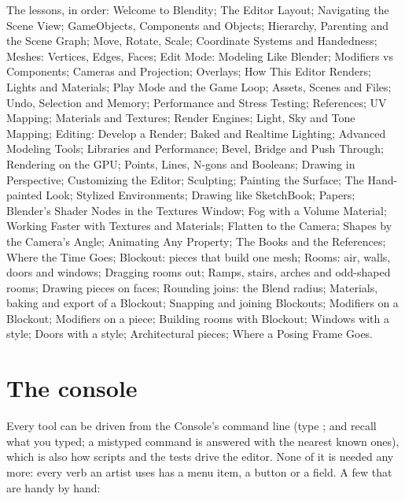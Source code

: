 The lessons, in order: Welcome to Blendity; The Editor Layout; Navigating the Scene View; GameObjects, Components and
Objects; Hierarchy, Parenting and the Scene Graph; Move, Rotate, Scale; Coordinate Systems and Handedness; Meshes:
Vertices, Edges, Faces; Edit Mode: Modeling Like Blender; Modifiers vs Components; Cameras and Projection; Overlays;
How This Editor Renders; Lights and Materials; Play Mode and the Game Loop; Assets, Scenes and Files; Undo, Selection
and Memory; Performance and Stress Testing; References; UV Mapping; Materials and Textures; Render Engines; Light, Sky
and Tone Mapping; Editing: Develop a Render; Baked and Realtime Lighting; Advanced Modeling Tools; Libraries and
Performance; Bevel, Bridge and Push Through; Rendering on the GPU; Points, Lines, N-gons and Booleans; Drawing in
Perspective; Customizing the Editor; Sculpting; Painting the Surface; The Hand-painted Look; Stylized Environments;
Drawing like SketchBook; Papers; Blender's Shader Nodes in the Textures Window; Fog with a Volume Material; Working
Faster with Textures and Materials; Flatten to the Camera; Shapes by the Camera's Angle; Animating Any Property; The Books and the References; Where the Time Goes; Blockout: pieces that build one mesh; Rooms: air,
walls, doors and windows; Dragging rooms out; Ramps, stairs, arches and odd-shaped rooms; Drawing pieces on faces; Rounding
joins: the Blend radius; Materials, baking and export of a Blockout; Snapping and joining Blockouts; Modifiers on a Blockout;
Modifiers on a piece; Building rooms with Blockout; Windows with a style; Doors with a style; Architectural pieces; Where a
Posing Frame Goes.

\section{The console}
Every tool can be driven from the Console's command line (type ;  and  recall what you
typed; a mistyped command is answered with the nearest known ones), which is also how scripts and the tests drive the
editor. None of it is needed any more: every verb an artist uses has a menu item, a button or a field. A few that are
handy by hand:

